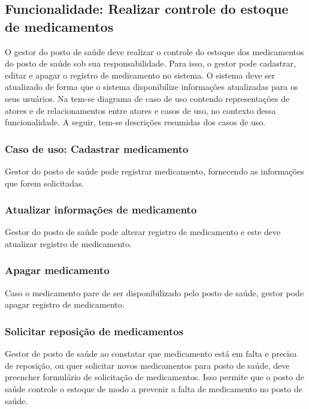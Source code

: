 %


\subsection{Funcionalidade: Realizar controle do estoque de medicamentos}

O gestor do posto de saúde deve realizar o controle do estoque dos medicamentos do posto de saúde sob sua responsabilidade. Para isso, o gestor pode cadastrar, editar e apagar o registro de medicamento no sistema. O sistema deve ser atualizado de forma que o sistema disponibilize informações atualizadas para os seus usuários. Na  tem-se diagrama de caso de uso contendo representações de atores e de relacionamentos entre atores e casos de uso, no contexto dessa funcionalidade. A seguir, tem-se descrições resumidas dos casos de uso.

\subsubsection{Caso de uso: Cadastrar medicamento}

Gestor do posto de saúde pode registrar medicamento, fornecendo as informações que forem solicitadas.

\subsubsection{Atualizar informações de medicamento}

Gestor do posto de saúde pode alterar registro de medicamento e este deve atualizar registro de medicamento. 

\subsubsection{Apagar medicamento}

Caso o medicamento pare de ser disponibilizado pelo posto de saúde, gestor pode apagar registro de medicamento.

\subsubsection{Solicitar reposição de medicamentos}
Gestor de posto de saúde ao constatar que medicamento está em falta e precisa de reposição, ou quer solicitar novos medicamentos para posto de saúde, deve preencher formulário de solicitação de medicamentos. Isso permite que o posto de saúde controle o estoque de modo a prevenir a falta de medicamento no posto de saúde.


